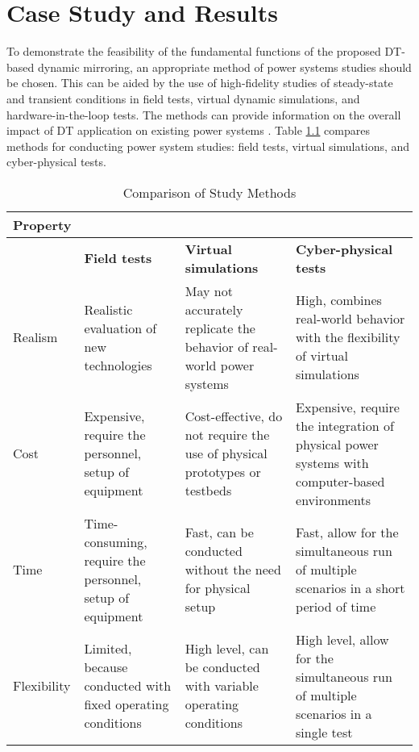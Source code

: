 \chapter{Case Study and Results}\label{ch:ch4}

To demonstrate the feasibility of the fundamental functions of the proposed DT-based dynamic mirroring, an appropriate method of power systems studies should be chosen. This can be aided by the use of high-fidelity studies of steady-state and transient conditions in field tests, virtual dynamic simulations, and hardware-in-the-loop  tests. The methods can provide information on the overall impact of DT application on existing power systems \autocite{10202933}. Table \ref{tab:study_methods} compares methods for conducting power system studies: field tests, virtual simulations, and cyber-physical tests.

\begin{table}[htbp]
    \centering
    \caption{Comparison of Study Methods \autocite{10202933}}
    \begin{tabular}{|>{\centering\arraybackslash}m{2.5cm}|>{\centering\arraybackslash}m{4cm}|>{\centering\arraybackslash}m{4.5cm}|>{\centering\arraybackslash}m{4.5cm}|}
        \hline
        \textbf{Property} & \multicolumn{3}{c|}{\textbf{Studies Methods}} \\ \cline{2-4}
        & \textbf{Field tests} & \textbf{Virtual simulations} & \textbf{Cyber-physical tests} \\ \hline
        Realism & Realistic evaluation of new technologies & May not accurately replicate the behavior of real-world power systems & High, combines real-world behavior with the flexibility of virtual simulations \\ \hline
        Cost & Expensive, require the personnel, setup of equipment & Cost-effective, do not require the use of physical prototypes or testbeds & Expensive, require the integration of physical power systems with computer-based environments \\ \hline
        Time & Time-consuming, require the personnel, setup of equipment & Fast, can be conducted without the need for physical setup & Fast, allow for the simultaneous run of multiple scenarios in a short period of time \\ \hline
        Flexibility & Limited, because conducted with fixed operating conditions & High level, can be conducted with variable operating conditions & High level, allow for the simultaneous run of multiple scenarios in a single test \\ \hline
    \end{tabular}
    \label{tab:study_methods}
\end{table}

